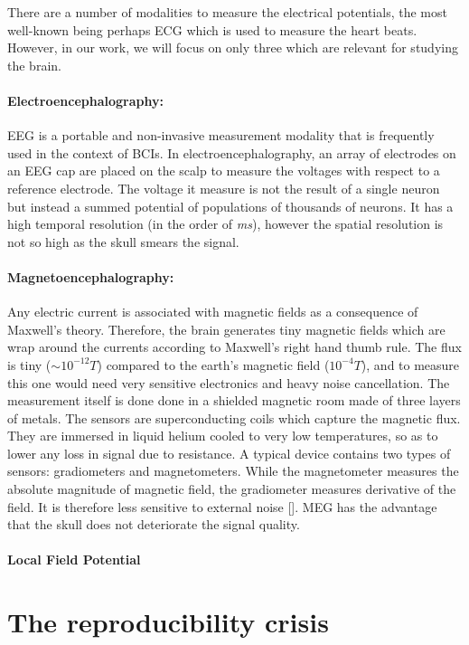 There are a number of modalities to measure the electrical potentials, the most well-known being perhaps \ac{ECG} which is used to measure the heart beats. However, in our work, we will focus on only three which are relevant for studying the brain.

\paragraph{Electroencephalography: } \Ac{EEG} is a portable and non-invasive measurement modality that is frequently used in the context of \acp{BCI}. In electroencephalography, an array of electrodes on an \ac{EEG} cap are placed on the scalp to measure the voltages with respect to a reference electrode. The voltage it measure is not the result of a single neuron but instead a summed potential of populations of thousands of neurons. It has a high temporal resolution (in the order of \emph{ms}), however the spatial resolution is not so high as the skull smears the signal.

\paragraph{Magnetoencephalography: } Any electric current is associated with magnetic fields as a consequence of Maxwell's theory. Therefore, the brain generates tiny magnetic fields which are wrap around the currents according to Maxwell's right hand thumb rule. The flux is tiny ($\sim10^{-12}T$) compared to the earth's magnetic field ($10^{-4}T$), and to measure this one would need very sensitive electronics and heavy noise cancellation. The measurement itself is done done in a shielded magnetic room made of three layers of metals. The sensors are superconducting coils which capture the magnetic flux. They are immersed in liquid helium cooled to very low temperatures, so as to lower any loss in signal due to resistance. A typical device contains two types of sensors: gradiometers and magnetometers. While the magnetometer measures the absolute magnitude of magnetic field, the gradiometer measures derivative of the field. It is therefore less sensitive to external noise []. MEG has the advantage that the skull does not deteriorate the signal quality.

\paragraph{Local Field Potential}


\section{The reproducibility crisis}


